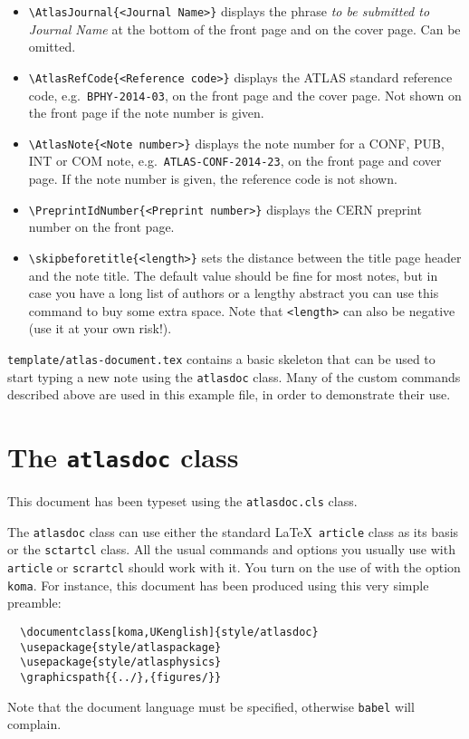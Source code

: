\documentclass[koma,UKenglish]{style/atlasdoc}
\begin{document}
\begin{itemize}
  \item {\verb|\AtlasJournal{<Journal Name>}|} displays the phrase \emph{to
    be submitted to Journal Name} at the bottom of the front page and
    on the cover page. Can be omitted.

  \item {\verb|\AtlasRefCode{<Reference code>}|} displays the ATLAS
    standard reference code, e.g.\ \texttt{BPHY-2014-03}, on the front page and
    the cover page. Not shown on the front page if the note number is given.

  \item {\verb|\AtlasNote{<Note number>}|} displays the note number
  	for a CONF, PUB, INT or COM note, e.g.\ \texttt{ATLAS-CONF-2014-23},
  	on the front page and cover page.
  	If the note number is given, the reference code is not shown.

  \item {\verb|\PreprintIdNumber{<Preprint number>}|} displays the CERN
  	preprint number on the front page.

  \item {\verb|\skipbeforetitle{<length>}|} sets the distance between
    the title page header and the note title. The default value should
    be fine for most notes, but in case you have a long list of
    authors or a lengthy abstract you can use this command to buy
    some extra space. Note that \verb|<length>| can also be negative
    (use it at your own risk!).
\end{itemize}
%
\texttt{template/atlas-document.tex} contains a basic skeleton that can be
used to start typing a new note using the \texttt{atlasdoc} class. Many of
the custom commands described above are used in this example file, in
order to demonstrate their use.


\section{The \texttt{atlasdoc} class}
\label{app:atlasdoc}

This document has been typeset using the \texttt{atlasdoc.cls} class.

The \texttt{atlasdoc} class can use either the standard \LaTeX\ \texttt{article} class
as its basis or the \KOMAScript \texttt{sctartcl} class.
All the usual commands and options you usually use
with \texttt{article}  or \texttt{scrartcl} should work with it. 
You turn on the use of \KOMAScript with the option \texttt{koma}.
For instance, this document has
been produced using this very simple preamble:
%
\begin{verbatim}
  \documentclass[koma,UKenglish]{style/atlasdoc}
  \usepackage{style/atlaspackage}
  \usepackage{style/atlasphysics}
  \graphicspath{{../},{figures/}}
\end{verbatim}
%
Note that the document language must be specified, otherwise \texttt{babel} will complain.
\end{document}
